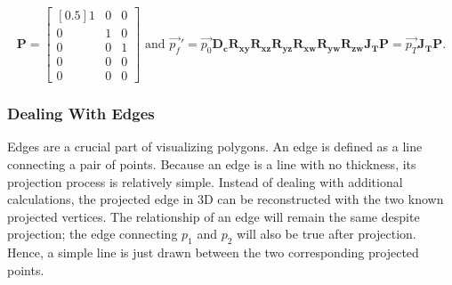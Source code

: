 \documentclass[12pt, letterpaper]{article}
\begin{document}
\begin{equation}
\mathbf{P} = \begin{bmatrix}[0.5] 1 & 0 & 0 \\ 0 & 1 & 0 \\ 0 & 0 & 1 \\0 & 0 & 0 \\ 0 & 0 & 0\end{bmatrix} \text{ and }
    \vec{p_f}' = \vec{p_0} \mathbf{D_c}\mathbf{R_{xy}}\mathbf{R_{xz}}\mathbf{R_{yz}}\mathbf{R_{xw}}\mathbf{R_{yw}}\mathbf{R_{zw}}\mathbf{J_T}\mathbf{P} = \vec{p_T}\mathbf{J_T}\mathbf{P}.
\end{equation}
\subsubsection{Dealing With Edges}
 Edges are a crucial part of visualizing polygons. An edge is defined as a line connecting a pair of points. Because an edge is a line with no thickness, its projection process is relatively simple. Instead of dealing with additional calculations, the projected edge in 3D can be reconstructed with the two known projected vertices. The relationship of an edge will remain the same despite projection; the edge connecting $p_1$ and $p_2$ will also be true after projection. Hence, a simple line is just drawn between the two corresponding projected points. 
\end{document}
